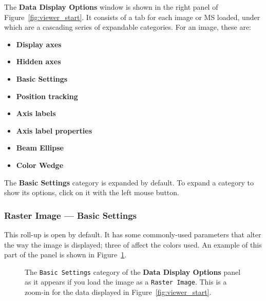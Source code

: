 The {\bf Data Display Options} window is shown in the right panel
of Figure~\ref{fig:viewer_start}.  It consists of a tab for each
image or MS loaded, under which are a cascading series of expandable
categories.  For an image, these are:
\begin{itemize}
   \item {\bf Display axes}
   \item {\bf Hidden axes}
   \item {\bf Basic Settings}
   \item {\bf Position tracking}
   \item {\bf Axis labels}
   \item {\bf Axis label properties}
   \item {\bf Beam Ellipse}
   \item {\bf Color Wedge}
\end{itemize}
The {\bf Basic Settings} category is expanded by
default.  To expand a category to show its options, click on it with
the left mouse button.


\subsubsection{Raster Image --- Basic Settings}
\label{section:display.image.raster.adjust.basic}

This roll-up is open by default.  It has some commonly-used parameters
that alter the way the image is displayed; three of affect the colors used.
An example of this part of the panel is shown in
Figure~\ref{fig:viewer_raster_basic}.

\begin{figure}[h!]
\begin{center}
\caption{\label{fig:viewer_raster_basic} The {\tt Basic Settings}
category of the {\bf Data Display Options} panel
as it appears if you load the image as a {\tt Raster Image}.
This is a zoom-in for the data displayed in Figure~\ref{fig:viewer_start}.}
\hrulefill
\end{center}
\end{figure}

